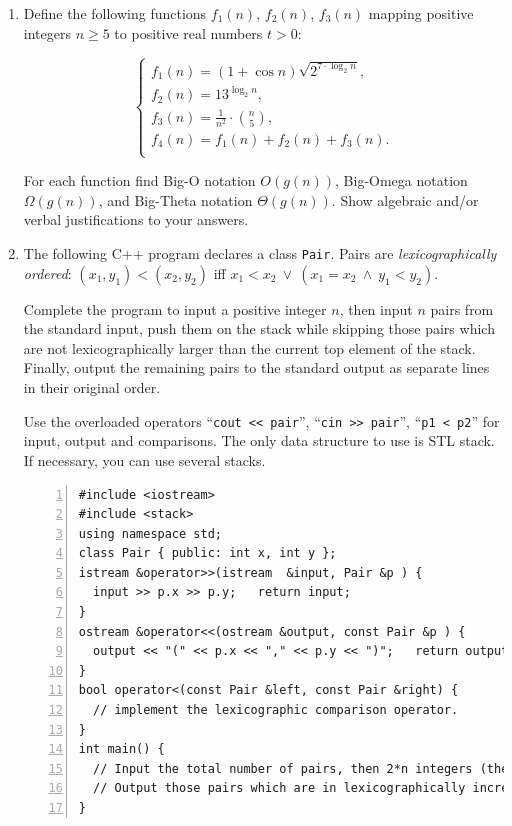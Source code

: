 \documentclass[a4paper,12pt]{article}
\begin{document}
\begin{enumerate}
\item

Define the following functions $f_1(n)$, $f_2(n)$, $f_3(n)$ mapping positive integers $n \geq 5$
to positive real numbers $t>0$: 

% 

\[ \left\{ \begin{array}{l}
f_1(n) = (1 + \cos n) \sqrt{2^{7 \cdot \log_2 n}},\\[1ex]
f_2(n) = 13^{\log_2 n},\\[1ex]
f_3(n) = \frac{1}{n^2} \cdot {n \choose 5},\\[1ex]
f_4(n) = f_1(n) + f_2(n) + f_3(n).\\
\end{array} \right.
\]

For each function find Big-O notation $O(g(n))$, Big-Omega notation $\Omega(g(n))$, and Big-Theta notation $\Theta(g(n))$. 
Show algebraic and/or verbal justifications to your answers.


\item

The following C++ program declares a class {\tt Pair}. 
Pairs are {\em lexicographically ordered}: 
$(x_1, y_1) < (x_2, y_2)$ iff $x_1 < x_2\ \vee\ (x_1 = x_2\ \wedge\ y_1 < y_2)$. 

Complete the program to input a positive integer $n$, then input $n$ pairs from the standard input, 
push them on the stack while skipping those pairs which are not lexicographically larger
than the current top element of the stack. Finally, output the remaining
pairs to the standard output as separate lines in their original order.

Use the overloaded operators ``{\tt cout << pair}'', ``{\tt cin >> pair}'', ``{\tt p1 < p2}''
for input, output and comparisons. The only data structure to use is STL stack. 
If necessary, you can use several stacks.

\begin{Verbatim}[frame=single,numbers=left]
#include <iostream>
#include <stack>
using namespace std;
class Pair { public: int x, int y }; 
istream &operator>>(istream  &input, Pair &p ) { 
  input >> p.x >> p.y;   return input;            
}
ostream &operator<<(ostream &output, const Pair &p ) { 
  output << "(" << p.x << "," << p.y << ")";   return output;            
}
bool operator<(const Pair &left, const Pair &right) {
  // implement the lexicographic comparison operator.
}
int main() {
  // Input the total number of pairs, then 2*n integers (the pairs). 
  // Output those pairs which are in lexicographically increasing order.
}
\end{Verbatim}


\end{enumerate}
\end{document}
